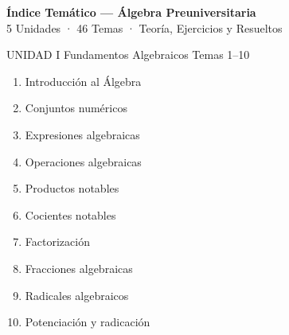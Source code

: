 
{
\hypersetup{linkcolor=AzulPizarra}
\tableofcontents
}
\newpage

\newpage
\thispagestyle{fancy}

\begin{center}
  {\Large\sffamily\bfseries\color{AzulPizarra} Índice Temático — Álgebra Preuniversitaria}\\[4pt]
  {\small\sffamily\color{GrisMedio} 5 Unidades · 46 Temas · Teoría, Ejercicios y Resueltos}
\end{center}

\vspace{0.6cm}

\begin{tcolorbox}[
    enhanced,
    colback   = AzulPizarra,
    colframe  = DoradoAcadémico,
    arc = 3pt, boxrule = 1pt,
    left = 8pt, right = 8pt, top = 5pt, bottom = 5pt,
    fontupper = \sffamily\bfseries\color{white}
  ]
  UNIDAD I \hfill Fundamentos Algebraicos \hfill Temas 1–10
\end{tcolorbox}

\begin{multicols}{2}
  \begin{enumerate}[label=\textcolor{AzulPizarra}{\textbf{\arabic*.}},
      leftmargin=2em, itemsep=1pt]
    \item Introducción al Álgebra
    \item Conjuntos numéricos
    \item Expresiones algebraicas
    \item Operaciones algebraicas
    \item Productos notables
    \item Cocientes notables
    \item Factorización
    \item Fracciones algebraicas
    \item Radicales algebraicos
    \item Potenciación y radicación
  \end{enumerate}
\end{multicols}

